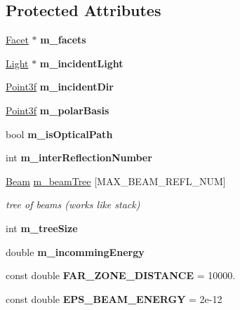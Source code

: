 \subsection*{Protected Attributes}
\begin{DoxyCompactItemize}
\item 
\mbox{\label{class_tracing_ac8f3377fa73be91dfdb166babed6255e}} 
\mbox{\hyperlink{class_facet}{Facet}} $\ast$ {\bfseries m\+\_\+facets}
\item 
\mbox{\label{class_tracing_a7dd12cbc4e59f2ba8b12ddd4b7aed76e}} 
\mbox{\hyperlink{class_light}{Light}} $\ast$ {\bfseries m\+\_\+incident\+Light}
\item 
\mbox{\label{class_tracing_aefe49bf5c3bffd54cddb2e0acb028f57}} 
\mbox{\hyperlink{struct_point3f}{Point3f}} {\bfseries m\+\_\+incident\+Dir}
\item 
\mbox{\label{class_tracing_aa3e14498c747ce375a67141152f99e10}} 
\mbox{\hyperlink{struct_point3f}{Point3f}} {\bfseries m\+\_\+polar\+Basis}
\item 
\mbox{\label{class_tracing_a26bb838f98169f69219761999f766ca9}} 
bool {\bfseries m\+\_\+is\+Optical\+Path}
\item 
\mbox{\label{class_tracing_a4daab6ec5b297894faa48b9967d0bd4c}} 
int {\bfseries m\+\_\+inter\+Reflection\+Number}
\item 
\mbox{\label{class_tracing_ae147e97b0754d62db2ac62fd36be2046}} 
\mbox{\hyperlink{class_beam}{Beam}} \mbox{\hyperlink{class_tracing_ae147e97b0754d62db2ac62fd36be2046}{m\+\_\+beam\+Tree}} \mbox{[}M\+A\+X\+\_\+\+B\+E\+A\+M\+\_\+\+R\+E\+F\+L\+\_\+\+N\+UM\mbox{]}
\begin{DoxyCompactList}\small\item\em tree of beams (works like stack) \end{DoxyCompactList}\item 
\mbox{\label{class_tracing_a92128489e2b53ece6da4cb069c7bcbbd}} 
int {\bfseries m\+\_\+tree\+Size}
\item 
\mbox{\label{class_tracing_a2bd7b2c3a83b1db6ccfee67425f88bca}} 
double {\bfseries m\+\_\+incomming\+Energy}
\item 
\mbox{\label{class_tracing_afb5d56155efe0b3b97a4663da3b48c0c}} 
const double {\bfseries F\+A\+R\+\_\+\+Z\+O\+N\+E\+\_\+\+D\+I\+S\+T\+A\+N\+CE} = 10000.
\item 
\mbox{\label{class_tracing_a2a957ec62acbabc7d1f1926bf75a00ff}} 
const double {\bfseries E\+P\+S\+\_\+\+B\+E\+A\+M\+\_\+\+E\+N\+E\+R\+GY} = 2e-\/12
\end{DoxyCompactItemize}



